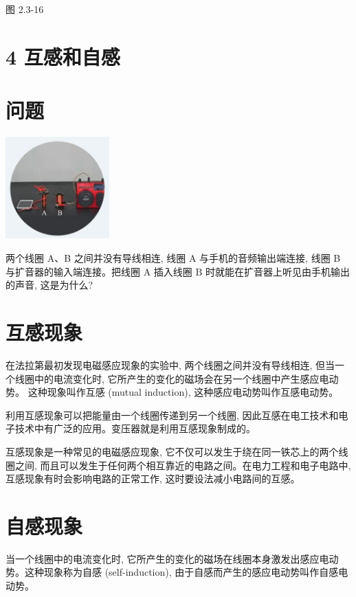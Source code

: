 \documentclass[10pt]{article}
\begin{document}
图 2.3-16

\section*{4 互感和自感}

\section*{问题}

\begin{center}
\includegraphics[max width=0.3\textwidth]{images/01910e72-c5b7-7ed5-a6d4-fb3a5faefc32_45_621765.jpg}
\end{center}

两个线圈 A、B 之间并没有导线相连, 线圈 A 与手机的音频输出端连接, 线圈 B 与扩音器的输入端连接。把线圈 \(\mathrm{A}\) 插入线圈 \(\mathrm{B}\) 时就能在扩音器上听见由手机输出的声音, 这是为什么?

\section*{互感现象}

在法拉第最初发现电磁感应现象的实验中, 两个线圈之间并没有导线相连, 但当一个线圈中的电流变化时, 它所产生的变化的磁场会在另一个线圈中产生感应电动势。 这种现象叫作互感 (mutual induction), 这种感应电动势叫作互感电动势。

利用互感现象可以把能量由一个线圈传递到另一个线圈, 因此互感在电工技术和电子技术中有广泛的应用。变压器就是利用互感现象制成的。

互感现象是一种常见的电磁感应现象, 它不仅可以发生于绕在同一铁芯上的两个线圈之间, 而且可以发生于任何两个相互靠近的电路之间。在电力工程和电子电路中, 互感现象有时会影响电路的正常工作, 这时要设法减小电路间的互感。

\section*{自感现象}

当一个线圈中的电流变化时, 它所产生的变化的磁场在线圈本身激发出感应电动势。这种现象称为自感 (self-induction), 由于自感而产生的感应电动势叫作自感电动势。
\end{document}
